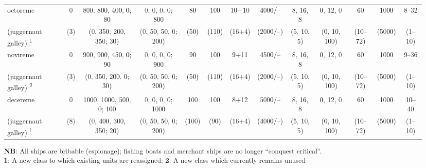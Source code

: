 \documentclass{article}
\begin{document}
\begin{landscape}
\begin{tabular}{l|ccc|ccccc|cccc}
\hline %
octoreme              &  0  &  800, 800, 400,   0; 80  &  0,  0,  0,  0;  800  &   80  &  100  &    10+10   &  4000/--  &   8, 16,  8  &    0,  12,   0  &  60  &  1000  &  8--32  \\ (juggernaut galley)
\textsuperscript{1}   & (3) &   (0, 350, 200, 350; 30) & (0, 50, 50,  0;  200) &  (50) & (110) &   (16+4)   & (2000/--) &  (5, 10,  5) &   (0,  10, 100) & (10--72) & (5000) & (1--10) \\
\hline %
novireme              &  0  &  900, 900, 450,   0; 90  &  0,  0,  0,  0;  900  &   90  &  100  &     9+11   &  4500/--  &   8, 16,  8  &    0,  12,   0  &  60  &  1000  &  9--36  \\ (juggernaut galley)
\textsuperscript{2}   & (3) &   (0, 350, 200,   0; 30) & (0, 50, 50,  0;  200) &  (50) & (110) &   (16+4)   & (2000/--) &  (5, 10,  5) &   (0,  10, 100) & (10--72) & (5000) & (1--10) \\
\hline %
decereme              &  0  & 1000, 1000, 500,  0; 100 &  0,  0,  0,  0; 1000  &  100  &  100  &     8+12   &  5000/--  &   8, 16,  8  &    0,  12,   0  &  60  &  1000  & 10--40  \\ (juggernaut galley)
\textsuperscript{1}   & (8) &   (0, 400, 300, 350; 20) & (0, 50, 50,  0;  200) & (100) &  (90) &   (16+4)   & (4000/--) &  (5, 10,  5) &   (0,  10, 100) & (10--72) & (5000) & (1--10) \\
\end{tabular}

\textbf{NB}: All ships are bribable (espionage); fishing boats and merchant ships are no longer ``conquest critical''.\\
\textbf{1}: A new class to which existing units are reassigned;
\textbf{2}: A new class which currently remains unused



\end{landscape}
\end{document}
